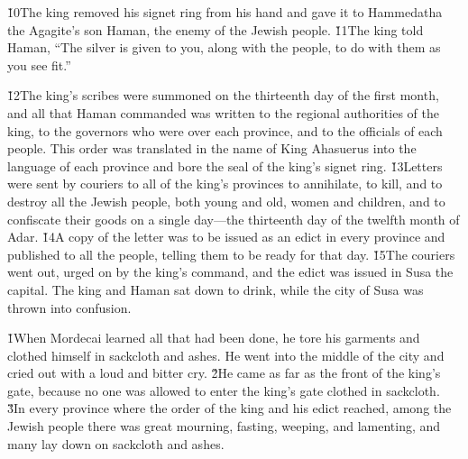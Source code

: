 \v{10}The king removed his signet ring from his hand and gave it to Hammedatha the Agagite's son Haman, the enemy of the Jewish people. \v{11}The king told Haman, ``The silver is given to you, along with the people, to do with them as you see fit.''

\v{12}The king's scribes were summoned on the thirteenth day of the first month, and all that Haman commanded was written to the regional authorities of the king, to the governors who were over each province, and to the officials of each people. This order was translated in the name of King Ahasuerus into the language of each province and bore the seal of the king's signet ring. \v{13}Letters were sent by couriers to all of the king's provinces to annihilate, to kill, and to destroy all the Jewish people, both young and old, women and children, and to confiscate their goods on a single day---the thirteenth day of the twelfth month of Adar. \v{14}A copy of the letter was to be issued as an edict in every province and published to all the people, telling them to be ready for that day. \v{15}The couriers went out, urged on by the king's command, and the edict was issued in Susa the capital. The king and Haman sat down to drink, while the city of Susa was thrown into confusion.

\v{1}When Mordecai learned all that had been done, he tore his garments and clothed himself in sackcloth and ashes. He went into the middle of the city and cried out with a loud and bitter cry. \v{2}He came as far as the front of the king's gate, because no one was allowed to enter the king's gate clothed in sackcloth. \v{3}In every province where the order of the king and his edict reached, among the Jewish people there was great mourning, fasting, weeping, and lamenting, and many lay down on sackcloth and ashes.

